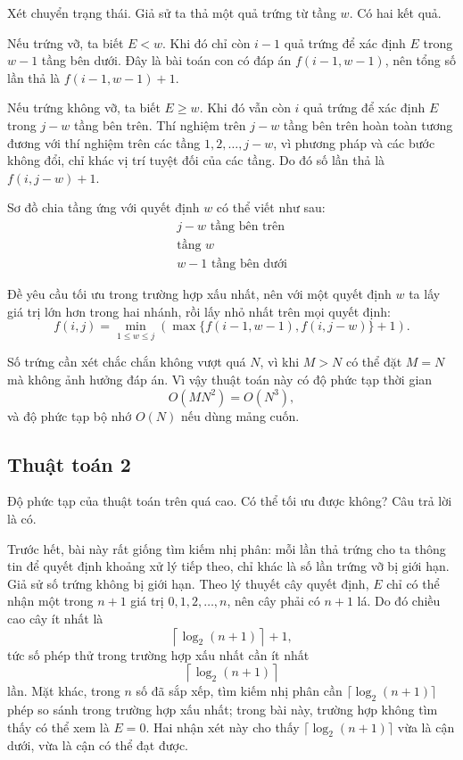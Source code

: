 \documentclass[11pt]{article}
\begin{document}
Xét chuyển trạng thái. Giả sử ta thả một quả trứng từ tầng $w$. Có hai kết quả.

Nếu trứng vỡ, ta biết $E<w$. Khi đó chỉ còn $i-1$ quả trứng để xác định $E$
trong $w-1$ tầng bên dưới. Đây là bài toán con có đáp án $f(i-1,w-1)$, nên
tổng số lần thả là $f(i-1,w-1)+1$.

Nếu trứng không vỡ, ta biết $E\ge w$. Khi đó vẫn còn $i$ quả trứng để xác định
$E$ trong $j-w$ tầng bên trên. Thí nghiệm trên $j-w$ tầng bên trên hoàn toàn
tương đương với thí nghiệm trên các tầng $1,2,\ldots,j-w$, vì phương pháp và
các bước không đổi, chỉ khác vị trí tuyệt đối của các tầng. Do đó số lần thả
là $f(i,j-w)+1$.

Sơ đồ chia tầng ứng với quyết định $w$ có thể viết như sau:
\[
\begin{array}{c}
\text{$j-w$ tầng bên trên}\\
\hline
\text{tầng $w$}\\
\hline
\text{$w-1$ tầng bên dưới}
\end{array}
\]

Đề yêu cầu tối ưu trong trường hợp xấu nhất, nên với một quyết định $w$ ta lấy
giá trị lớn hơn trong hai nhánh, rồi lấy nhỏ nhất trên mọi quyết định:
\[
  f(i,j)=
  \min_{1\le w\le j}
  \left(\max\{f(i-1,w-1),f(i,j-w)\}+1\right).
  \tag{1}
\]

Số trứng cần xét chắc chắn không vượt quá $N$, vì khi $M>N$ có thể đặt
$M=N$ mà không ảnh hưởng đáp án. Vì vậy thuật toán này có độ phức tạp thời
gian
\[
  O(MN^2)=O(N^3),
\]
và độ phức tạp bộ nhớ $O(N)$ nếu dùng mảng cuốn.

\subsection{Thuật toán 2}

Độ phức tạp của thuật toán trên quá cao. Có thể tối ưu được không? Câu trả lời
là có.

Trước hết, bài này rất giống tìm kiếm nhị phân: mỗi lần thả trứng cho ta thông
tin để quyết định khoảng xử lý tiếp theo, chỉ khác là số lần trứng vỡ bị giới
hạn. Giả sử số trứng không bị giới hạn. Theo lý thuyết cây quyết định,
$E$ chỉ có thể nhận một trong $n+1$ giá trị $0,1,2,\ldots,n$, nên cây phải có
$n+1$ lá. Do đó chiều cao cây ít nhất là
\[
  \left\lceil \log_2(n+1)\right\rceil+1,
\]
tức số phép thử trong trường hợp xấu nhất cần ít nhất
\[
  \left\lceil \log_2(n+1)\right\rceil
\]
lần. Mặt khác, trong $n$ số đã sắp xếp, tìm kiếm nhị phân cần
$\lceil\log_2(n+1)\rceil$ phép so sánh trong trường hợp xấu nhất; trong bài
này, trường hợp không tìm thấy có thể xem là $E=0$. Hai nhận xét này cho thấy
$\lceil\log_2(n+1)\rceil$ vừa là cận dưới, vừa là cận có thể đạt được.
\end{document}
